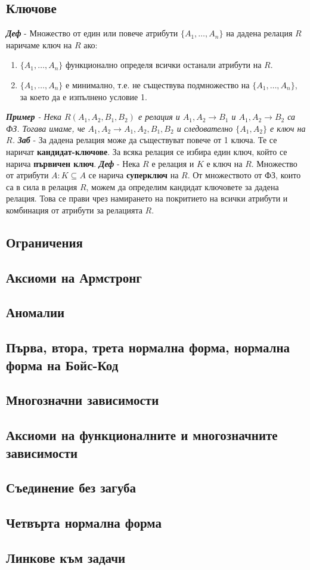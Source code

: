 \documentclass[fleqn,12pt]{article}
\begin{document}
\subsection{Ключове}

\textbf{\textit{Деф}} - Множество от един или повече атрибути $\{A_1, \dots, A_n\}$ на дадена релация $R$ наричаме ключ на $R$ ако:
\begin{enumerate}
    \item $\{A_1, \dots, A_n\}$ функционално определя всички останали атрибути на $R$.
    \item $\{A_1, \dots, A_n\}$ е минимално, т.е. не съществува подмножество на $\{A_1, \dots, A_n\}$, за което да е изпълнено условие 1.
\end{enumerate}
\bigbreak
\textit{\textbf{Пример} - Нека $R(A_1, A_2, B_1, B_2)$ е релация и $A_1, A_2 \rightarrow B_1$ и $A_1, A_2 \rightarrow B_2$ са ФЗ.
Тогава имаме, че $A_1, A_2 \rightarrow A_1, A_2, B_1, B_2$ и следователно $\{A_1, A_2\}$ е ключ на $R$.}
\bigbreak
\textbf{\textit{Заб}} - За дадена релация може да съществуват повече от 1 ключа.
Те се наричат \textbf{кандидат-ключове}.
За всяка релация се избира един ключ, който се нарича \textbf{първичен ключ}.
\bigbreak
\textbf{\textit{Деф}} - Нека $R$ е релация и $K$ е ключ на $R$. Множество от атрибути $A: K \subseteq A$ се нарича \textbf{суперключ} на $R$.
\bigbreak
От множеството от ФЗ, които са в сила в релация $R$, можем да определим кандидат ключовете за дадена релация.
Това се прави чрез намирането на покритието на всички атрибути и комбинация от атрибути за релацията $R$.


\subsection{Ограничения}
\subsection{Аксиоми на Армстронг}
\subsection{Аномалии}

\subsection{Първа, втора, трета нормална форма, нормална форма на Бойс-Код}
\subsection{Многозначни зависимости}

\subsection{Аксиоми на функционалните и многозначните зависимости}

\subsection{Съединение без загуба}

\subsection{Четвърта нормална форма}

\subsection{Линкове към задачи}
\end{document}
